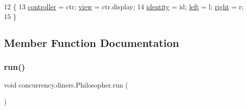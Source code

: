 \begin{DoxyCode}
12                                                   \{
13     \mbox{\hyperlink{classconcurrency_1_1diners_1_1_philosopher_a92157e1742f905b5fde4f58437d8c41f}{controller}} = ctr; \mbox{\hyperlink{classconcurrency_1_1diners_1_1_philosopher_a2199286e6b640f1398de1b2eeeedf478}{view}} = ctr.display;
14     \mbox{\hyperlink{classconcurrency_1_1diners_1_1_philosopher_a857d8882220e7e07a789a77cac3a6975}{identity}} = id; \mbox{\hyperlink{classconcurrency_1_1diners_1_1_philosopher_ab7a3ed11b232741170a3e2b3cd2b76ce}{left}} = l; \mbox{\hyperlink{classconcurrency_1_1diners_1_1_philosopher_ac9c6e05b2b2b0d9d78c68cb2e51b96f7}{right}} = r;
15   \}
\end{DoxyCode}


\subsection{Member Function Documentation}
\mbox{\label{classconcurrency_1_1diners_1_1_philosopher_a7c998b2c972341a5d6afd8f35e55a749}} 
\subsubsection{\texorpdfstring{run()}{run()}}
{\footnotesize\ttfamily void concurrency.\+diners.\+Philosopher.\+run (\begin{DoxyParamCaption}{ }\end{DoxyParamCaption})\hspace{0.3cm}{\ttfamily [inline]}}


